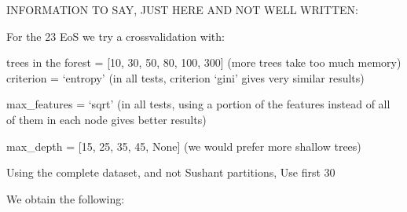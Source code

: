 INFORMATION TO SAY, JUST HERE AND NOT WELL WRITTEN:

For the 23 EoS we try a crossvalidation with:

trees in the forest = [10, 30, 50, 80, 100, 300]  (more trees take too much memory)
criterion = ‘entropy’    (in all tests, criterion ‘gini’ gives very similar results)

max\_features = ‘sqrt’ (in all tests, using a portion of the features instead of all of them in each node gives better results)

max\_depth = [15, 25, 35, 45, None] (we would prefer more shallow trees)

Using the complete dataset, and not Sushant partitions, Use  first 30%

We obtain the following:

